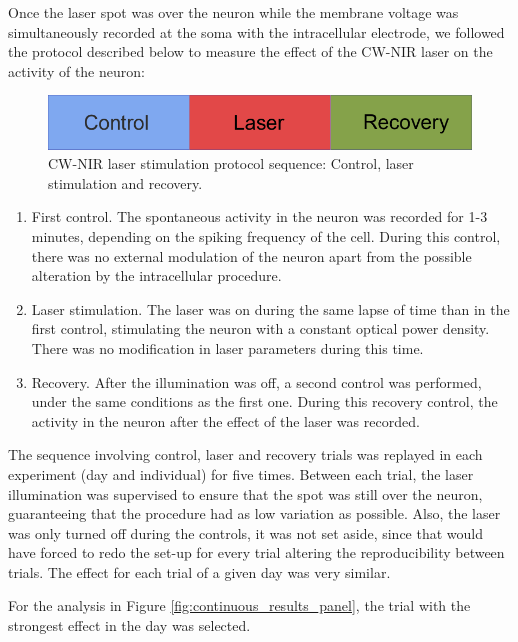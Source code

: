 Once the laser spot was over the neuron while the membrane voltage was simultaneously recorded at the soma with the intracellular electrode, we followed the protocol described below to measure the effect of the CW-NIR laser on the activity of the neuron:

\begin{figure}[htb!]
	\includegraphics[width=\textwidth]{img/laser/trial-protocol.pdf}
	\caption{CW-NIR laser stimulation protocol sequence: Control, laser stimulation and recovery.}
	\label{fig:protocol scheme}
\end{figure}

\begin{enumerate}
	\item First control. The spontaneous activity in the neuron was recorded for 1-3 minutes, depending on the spiking frequency of the cell. During this control, there was no external modulation of the neuron apart from the possible alteration by the intracellular procedure.  
	\item Laser stimulation. The laser was on during the same lapse of time than in the first control, stimulating the neuron with a constant optical power density. There was no modification in laser parameters during this time.
	\item Recovery. After the illumination was off, a second control was performed, under the same conditions as the first one. During this recovery control, the activity in the neuron after the effect of the laser was recorded.
\end{enumerate}



The sequence involving control, laser and recovery trials was replayed in each experiment (day and individual) for five times. Between each trial, the laser illumination was supervised to ensure that the spot was still over the neuron, guaranteeing that the procedure had as low variation as possible. Also, the laser was only turned off during the controls, it was not set aside, since that would have forced to redo the set-up for every trial altering the reproducibility between trials. The effect for each trial of a given day was very similar. 


For the analysis in Figure \ref{fig:continuous_results_panel}, the trial with the strongest effect in the day was selected. 



